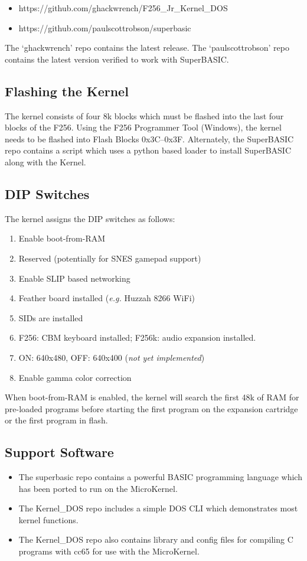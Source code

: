 \begin{itemize}
    \item  https://github.com/ghackwrench/F256\_Jr\_Kernel\_DOS
    \item  https://github.com/paulscottrobson/superbasic
\end{itemize}

The `ghackwrench' repo contains the latest release.  The `paulscottrobson' repo contains the latest version verified to work with SuperBASIC.

\subsection*{Flashing the Kernel}
The kernel consists of four 8k blocks which must be flashed into the last four blocks of the F256.  Using the F256 Programmer Tool (Windows), the kernel needs to be flashed into Flash Blocks 0x3C--0x3F.  Alternately, the SuperBASIC repo contains a script which uses a python based loader to install SuperBASIC along with the Kernel.

\subsection*{DIP Switches}
The kernel assigns the DIP switches as follows:

\begin{enumerate}
\item Enable boot-from-RAM
\item Reserved (potentially for SNES gamepad support)
\item Enable SLIP based networking
\item Feather board installed ({\it e.g.} Huzzah 8266 WiFi)
\item SIDs are installed
\item F256: CBM keyboard installed; F256k: audio expansion installed.
\item ON: 640x480, OFF: 640x400 ({\em not yet implemented})
\item Enable gamma color correction
\end{enumerate}

When boot-from-RAM is enabled, the kernel will search the first 48k of RAM for pre-loaded programs before starting the first program on the expansion cartridge or the first program in flash.

\subsection*{Support Software}
\begin{itemize}
    \item The superbasic repo contains a powerful BASIC programming language which has been ported to run on the MicroKernel.
    \item The Kernel\_DOS repo includes a simple DOS CLI which demonstrates most kernel functions.
    \item The Kernel\_DOS repo also contains library and config files for compiling C programs with cc65 for use with the MicroKernel.
\end{itemize}


